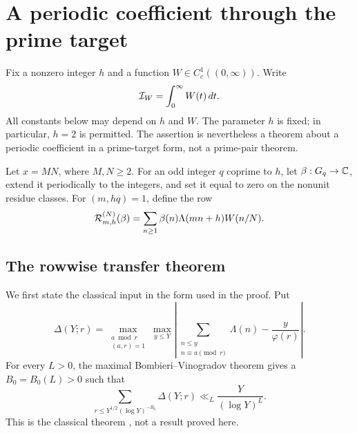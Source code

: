 \section{A periodic coefficient through the prime target}
\label{sec:prime-target-transfer}

Fix a nonzero integer $h$ and a function $W\in C_c^1((0,\infty))$.
Write
\begin{equation}\label{eq:I-W}
 \mathcal I_W=\int_0^\infty W(t)\,dt.
\end{equation}
All constants below may depend on $h$ and $W$.  The parameter $h$ is fixed;
in particular, $h=2$ is permitted.  The assertion is nevertheless a theorem
about a periodic coefficient in a prime-target form, not a prime-pair
theorem.

Let $x=MN$, where $M,N\geq2$.  For an odd integer $q$ coprime to $h$, let
$\beta:G_q\to\mathbb C$, extend it periodically to the integers, and set it equal
to zero on the nonunit residue classes.  For $(m,hq)=1$, define the row
\begin{equation}\label{eq:prime-target-row}
 \mathcal R_{m,h}^{(N)}(\beta)
 =\sum_{n\geq1}\beta(n)\Lambda(mn+h)W(n/N).
\end{equation}

\subsection{The rowwise transfer theorem}

We first state the classical input in the form used in the proof.  Put
\begin{equation}\label{eq:Delta-definition}
 \Delta(Y;r)=
 \max_{\substack{a\bmod r\\(a,r)=1}}
 \max_{y\leq Y}
 \left|
  \sum_{\substack{n\leq y\\n\equiv a\pmod r}}\Lambda(n)
  -\frac{y}{\varphi(r)}
 \right|.
\end{equation}
For every $L>0$, the maximal Bombieri--Vinogradov theorem gives a
$B_0=B_0(L)>0$ such that
\begin{equation}\label{eq:maximal-BV}
 \sum_{r\leq Y^{1/2}(\log Y)^{-B_0}}\Delta(Y;r)
 \ll_L \frac{Y}{(\log Y)^L}.
\end{equation}
This is the classical theorem
\citep{Bombieri1965,Vinogradov1965,IwaniecKowalski2004}, not a result proved
here.

